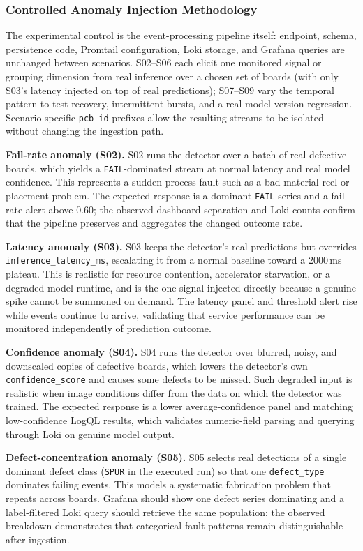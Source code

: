 \documentclass[12pt,a4paper]{article}
\begin{document}
\subsubsection{Controlled Anomaly Injection Methodology}
The experimental control is the event-processing pipeline itself: endpoint,
schema, persistence code, Promtail configuration, Loki storage, and Grafana
queries are unchanged between scenarios. S02--S06 each elicit one monitored signal
or grouping dimension from real inference over a chosen set of boards (with only
S03's latency injected on top of real predictions); S07--S09 vary the temporal
pattern to test recovery, intermittent bursts, and a real model-version
regression. Scenario-specific \texttt{pcb\_id} prefixes allow the resulting
streams to be isolated without changing the ingestion path.

\textbf{Fail-rate anomaly (S02).}
S02 runs the detector over a batch of real defective boards, which yields a
\texttt{FAIL}-dominated stream at normal latency and real model confidence.
This represents a sudden process fault such as a bad material reel or placement
problem. The expected response is a dominant \texttt{FAIL} series and a
fail-rate alert above 0.60; the observed dashboard separation and Loki counts
confirm that the pipeline preserves and aggregates the changed outcome rate.

\textbf{Latency anomaly (S03).}
S03 keeps the detector's real predictions but overrides
\texttt{inference\_latency\_ms}, escalating it from a normal baseline toward a
2000\,ms plateau. This is realistic for resource contention, accelerator
starvation, or a degraded model runtime, and is the one signal injected directly
because a genuine spike cannot be summoned on demand. The latency panel and threshold alert rise while events continue to
arrive, validating that service performance can be monitored independently of
prediction outcome.

\textbf{Confidence anomaly (S04).}
S04 runs the detector over blurred, noisy, and downscaled copies of defective
boards, which lowers the detector's own \texttt{confidence\_score} and causes some
defects to be missed. Such degraded input is realistic when image conditions
differ from the data on which the detector was trained. The expected response is
a lower average-confidence panel and matching low-confidence LogQL results, which
validates numeric-field parsing and querying through Loki on genuine model
output.

\textbf{Defect-concentration anomaly (S05).}
S05 selects real detections of a single dominant defect class (\texttt{SPUR} in
the executed run) so that one \texttt{defect\_type} dominates failing events. This
models a systematic fabrication problem that repeats across boards. Grafana should show one defect series dominating and a
label-filtered Loki query should retrieve the same population; the observed
breakdown demonstrates that categorical fault patterns remain distinguishable
after ingestion.
\end{document}
